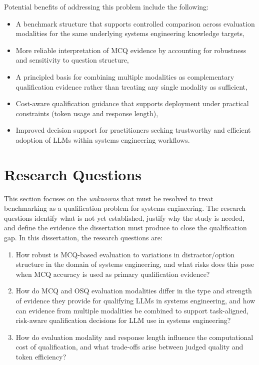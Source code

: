 Potential benefits of addressing this problem include the following:
\begin{itemize} 
    \item A benchmark structure that supports controlled comparison across evaluation modalities for the same underlying systems engineering knowledge targets,
    \item More reliable interpretation of MCQ evidence by accounting for robustness and sensitivity to question structure, 
    \item A principled basis for combining multiple modalities as complementary qualification evidence rather than treating any single modality as sufficient, 
    \item Cost-aware qualification guidance that supports deployment under practical constraints (token usage and response length), 
    \item Improved decision support for practitioners seeking trustworthy and efficient adoption of LLMs within systems engineering workflows. 
\end{itemize}

 
\section{Research Questions}\label{sec:research_questions}

This section focuses on the \emph{unknowns} that must be resolved to treat benchmarking as a qualification problem for systems engineering.  The research questions identify what is not yet established, justify why the study is needed, and define the evidence the dissertation must produce to close the qualification gap. In this dissertation, the research questions are: 

\begin{enumerate}
    \item How robust is MCQ-based evaluation to variations in distractor/option structure in the domain of systems engineering, and what risks does this pose when MCQ accuracy is used as primary qualification evidence? \label{RQ1}
    \item How do MCQ and OSQ evaluation modalities differ in the type and strength of evidence they provide for qualifying LLMs in systems engineering, and how can evidence from multiple modalities be combined to support task-aligned, risk-aware qualification decisions for LLM use in systems engineering? \label{RQ2}
    \item How do evaluation modality and response length influence the computational cost of qualification, and what trade-offs arise between judged quality and token efficiency? \label{RQ3}
\end{enumerate}




